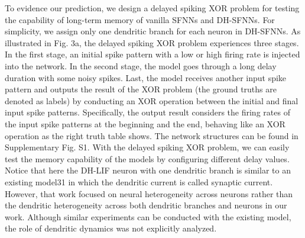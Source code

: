 To evidence our prediction, we design a delayed spiking XOR problem for testing the capability of long-term memory of vanilla SFNNs and DH-SFNNs. For simplicity, we assign only one dendritic branch for each neuron in DH-SFNNs. As illustrated in Fig. 3a, the delayed spiking XOR problem experiences three stages. In the first stage, an initial spike pattern with a low or high firing rate is injected into the network. In the second stage, the model goes through a long delay duration with some noisy spikes. Last, the model receives another input spike pattern and outputs the result of the XOR problem (the ground truths are denoted as labels) by conducting an XOR operation between the initial and final input spike patterns. Specifically, the output result considers the firing rates of the input spike patterns at the beginning and the end, behaving like an XOR operation as the right truth table shows. The network structures can be found in Supplementary Fig. S1. With the delayed spiking XOR problem, we can easily test the memory capability of the models by configuring different delay values. Notice that here the DH-LIF neuron with one dendritic branch is similar to an existing model31 in which the dendritic current is called synaptic current. However, that work focused on neural heterogeneity across neurons rather than the dendritic heterogeneity across both dendritic branches and neurons in our work. Although similar experiments can be conducted with the existing model, the role of dendritic dynamics was not explicitly analyzed.

